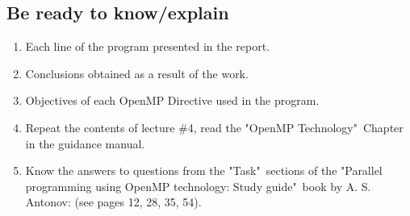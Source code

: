{ %
	\subsection{Be ready to know/explain}
	\begin{enumerate}
		\item Each line of the program presented in the report.
		\item Conclusions obtained as a result of the work.
		\item Objectives of each OpenMP Directive used in the program.
		\item Repeat the contents of lecture \#4, read the "OpenMP Technology"\ Chapter in the guidance manual.
		\item Know the answers to questions from the "Task"\ sections of the "Parallel programming using OpenMP technology: Study guide"\ book by A. S. Antonov:  (see pages 12, 28, 35, 54).
		
	\end{enumerate}
}